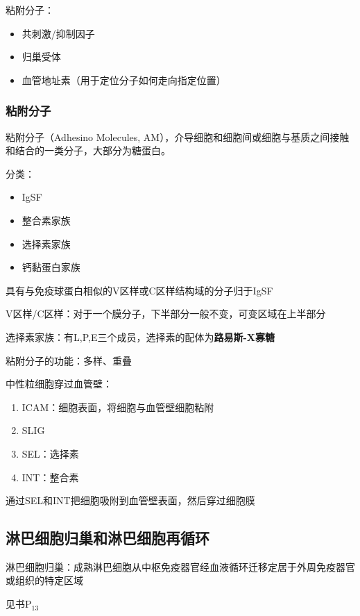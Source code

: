 粘附分子：
\begin{itemize}
    \item 共刺激/抑制因子
    \item 归巢受体
    \item 血管地址素（用于定位分子如何走向指定位置）
\end{itemize}
\subsubsection*{粘附分子}%
\label{subsub:粘附分子}
\begin{defi}
    粘附分子（Adhesino Molecules, AM），介导细胞和细胞间或细胞与基质之间接触和结合的一类分子，大部分为糖蛋白。
\end{defi}
分类：
\begin{itemize}
    \item IgSF
    \item 整合素家族
    \item 选择素家族
    \item 钙黏蛋白家族
\end{itemize}
具有与免疫球蛋白相似的V区样或C区样结构域的分子归于IgSF
\begin{notation}
    V区样/C区样：对于一个膜分子，下半部分一般不变，可变区域在上半部分
\end{notation}
\begin{notation}
    选择素家族：有L,P,E三个成员，选择素的配体为\textbf{路易斯-X寡糖}
\end{notation}
粘附分子的功能：多样、重叠
\begin{eg}
    中性粒细胞穿过血管壁：
    \begin{enumerate}
        \item ICAM：细胞表面，将细胞与血管壁细胞粘附
        \item SLIG
        \item SEL：选择素
        \item INT：整合素
        
    \end{enumerate}
    通过SEL和INT把细胞吸附到血管壁表面，然后穿过细胞膜
\end{eg}
\subsection{淋巴细胞归巢和淋巴细胞再循环}%
\label{sub:淋巴细胞归巢和淋巴细胞再循环}
\begin{defi}
    淋巴细胞归巢：成熟淋巴细胞从中枢免疫器官经血液循环迁移定居于外周免疫器官或组织的特定区域
\end{defi}
见书$\text{P}_{13}$
